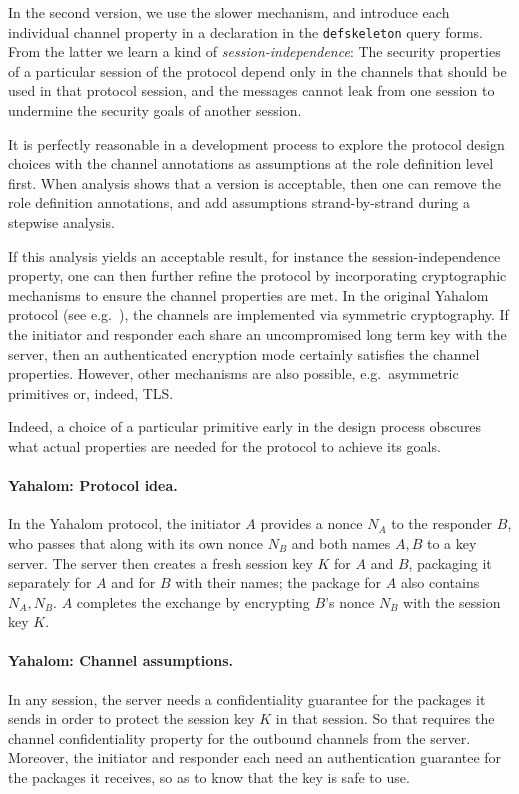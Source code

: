 In the second version, we use the slower mechanism, and introduce each
individual channel property in a declaration in the \verb|defskeleton|
query forms.  From the latter we learn a kind of
\emph{session-independence\/}:  The security properties of a
particular session of the protocol depend only in the channels that
should be used in that protocol session, and the messages cannot leak
from one session to undermine the security goals of another session.

It is perfectly reasonable in a development process to explore the
protocol design choices with the channel annotations as assumptions at
the role definition level first.  When analysis shows that a version
is acceptable, then one can remove the role definition annotations,
and add assumptions strand-by-strand during a stepwise analysis.

If this analysis yields an acceptable result, for instance the
session-independence property, one can then further refine the
protocol by incorporating cryptographic mechanisms to ensure the
channel properties are met.  In the original Yahalom protocol (see
e.g.~\cite{Paulson97c}), the channels are implemented via symmetric
cryptography.  If the initiator and responder each share an
uncompromised long term key with the server, then an authenticated
encryption mode certainly satisfies the channel properties.  However,
other mechanisms are also possible, e.g.~asymmetric primitives or,
indeed, TLS.

Indeed, a choice of a particular primitive early in the design process
obscures what actual properties are needed for the protocol to achieve
its goals.


\paragraph{Yahalom:  Protocol idea.}  In the Yahalom protocol, the
initiator $A$ provides a nonce $N_A$ to the responder $B$, who passes
that along with its own nonce $N_B$ and both names $A,B$ to a key
server.  The server then creates a fresh session key $K$ for $A$ and
$B$, packaging it separately for $A$ and for $B$ with their names; the
package for $A$ also contains $N_A,N_B$.  $A$ completes the exchange
by encrypting $B$'s nonce $N_B$ with the session key $K$.

\paragraph{Yahalom:  Channel assumptions.}  In any session, the server
needs a confidentiality guarantee for the packages it sends in order
to protect the session key $K$ in that session.  So that requires the
channel confidentiality property for the outbound channels from the
server.  Moreover, the initiator and responder each need an
authentication guarantee for the packages it receives, so as to know
that the key is safe to use.

